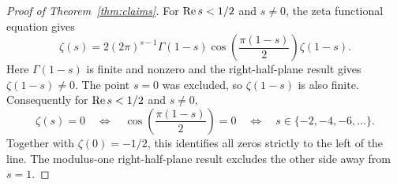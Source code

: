 \begin{proof}[Proof of Theorem~\ref{thm:claims}]
For \(\operatorname{Re} s<1/2\) and \(s\ne 0\), the zeta functional
equation \cite[(25.4.1)]{zeta} gives
\[
 \zeta(s)=2(2\pi)^{s-1}\Gamma(1-s)
           \cos\left(\frac{\pi(1-s)}2\right)\zeta(1-s).
\]
Here \(\Gamma(1-s)\) is finite and nonzero and the
right-half-plane result gives \(\zeta(1-s)\ne0\).
The point \(s=0\) was excluded, so \(\zeta(1-s)\) is also finite.
Consequently for \(\operatorname{Re} s<1/2\) and \(s\ne0\),
\[
 \zeta(s)=0 \quad\Longleftrightarrow\quad
 \cos\!\left(\frac{\pi(1-s)}2\right)=0
 \quad\Longleftrightarrow\quad s\in\{-2,-4,-6,\ldots\}.
\]
Together with \(\zeta(0)=-1/2\), this identifies all zeros
strictly to the left of the line. The modulus-one
right-half-plane result excludes the other side away from \(s=1\).
\end{proof}

